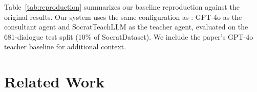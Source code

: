 \documentclass[11pt]{article}
\begin{document}
Table~\ref{tab:reproduction} summarizes our baseline reproduction against the original results. Our system uses the same configuration as \citet{peng2025kele}: GPT-4o as the consultant agent and SocratTeachLLM as the teacher agent, evaluated on the 681-dialogue test split (10\% of SocratDataset). We include the paper's GPT-4o teacher baseline for additional context.

\begin{table}[t]
  \centering
  \small
  \caption{Reproduction comparison on the 681-dialogue test split. R-1/2/L = ROUGE-1/2/L (F1). Both the original and our system use GPT-4o as the consultant and SocratTeachLLM as the teacher. Our ROUGE-L closely matches the paper's GPT-4o teacher baseline (38.02 vs.\ 38.27), and our ROUGE-2 exceeds it (26.04 vs.\ 22.55), confirming that SocratTeachLLM provides meaningful gains over a general-purpose teacher. The BLEU-4 gap likely stems from undocumented generation parameters in the original work.}
  \label{tab:reproduction}
\end{table}

\section{Related Work}
\end{document}
